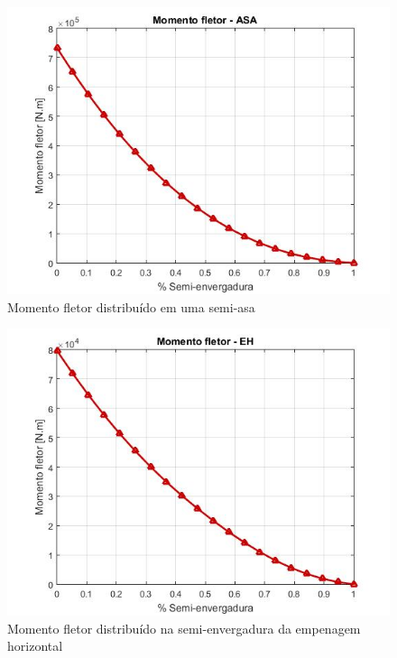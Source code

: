 \begin{figure}
\centering
\includegraphics[width=\textwidth]{cargas/imagens/flet_ASA.JPG}
\caption{Momento fletor distribuído em uma semi-asa}
\label{fig:flet_ASA}
\end{figure}

\begin{figure}
\centering
\includegraphics[width=\textwidth]{cargas/imagens/flet_EH.JPG}
\caption{Momento fletor distribuído na semi-envergadura da empenagem horizontal}
\label{fig:flet_EH}
\end{figure}

